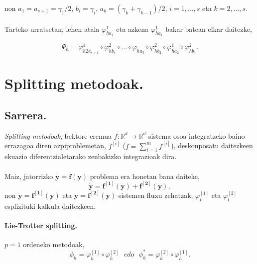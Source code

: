 non $a_1=a_{s+1}=\gamma_1/2$, $b_i=\gamma_i$, $a_k=(\gamma_k+\gamma_{k-1})/2$, $i=1,\dots,s$ eta $k=2,\dots,s$.

\paragraph*{}Tarteko urratsetan, lehen atala $\varphi_{h a_1}^{1}$ eta azkena $\varphi_{h a_1}^{1}$ bakar batean elkar daitezke, 

\begin{equation*}
\Psi_h=\varphi_{h 2 a_{s+1}}^{1} \circ \varphi_{h b_s}^{2} \circ \dots 
       \circ
       \varphi_{h a_3} \circ \varphi_{h b_2}^{2} 
       \circ
       \varphi_{h a_2}^{1} \circ \varphi_{h b_1}^{2}.
\end{equation*}

\section{Splitting metodoak.}

\subsection{Sarrera.}

\emph{Splitting metodoak}, bektore eremua $f: \mathbb{R}^d \rightarrow \mathbb{R}^d$ sistema osoa integratzeko baino errazagoa diren azpiproblemetan, $f^{[i]}$ ($f=\sum\limits_{i=1}^{m} f^{[i]}$), deskonposatu daitezkeen ekuazio diferentzialetarako zenbakizko integrazioak dira.  

\paragraph*{}Maiz, jatorrizko $\dot{\mathbf{y}}=\mathbf{f}(\mathbf{y})$ problema era honetan bana daiteke,
\begin{equation}
\dot{\mathbf{y}}=\mathbf{f^{[1]}}(\mathbf{y})+\mathbf{f^{[2]}}(\mathbf{y}),
\end{equation} 
non $\dot{\mathbf{y}}=\mathbf{f^{[1]}}(\mathbf{y})$ eta $\dot{\mathbf{y}}=\mathbf{f^{[2]}}(\mathbf{y})$ sistemen fluxu zehatzak, $\varphi_t^{[1]}$ eta $\varphi_t^{[2]}$ esplizituki kalkula daitezkeen. 

\paragraph*{\textbf{Lie-Trotter splitting}.}
$p=1$ ordeneko metodoak,
\begin{equation}
\phi_h = \varphi_h^{[1]} \circ \varphi_h^{[2]} \ \ \ edo \ \ \ \phi_h^{*} = \varphi_h^{[2]} \circ \varphi_h^{[1]} .
\end{equation}

